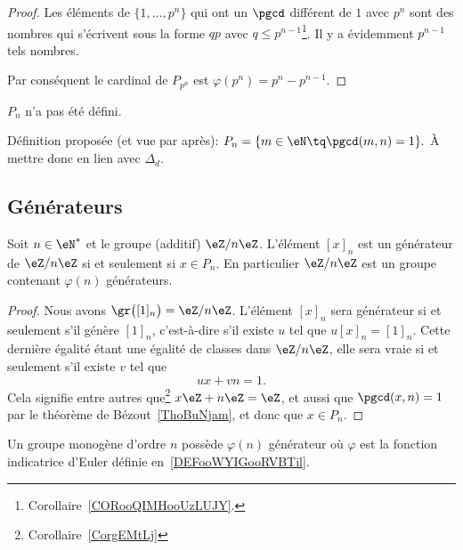 \begin{proof}
    Les éléments de \( \{ 1,\ldots,p^n \}\) qui ont un \( \pgcd\) différent de \( 1\) avec \( p^n\) sont des nombres qui s'écrivent sous la forme \( qp\) avec \( q\leq p^{n-1}\)\footnote{Corollaire~\ref{CORooQIMHooUzLUJY}.}. Il y a évidemment \( p^{n-1}\) tels nombres.

    Par conséquent le cardinal de \( P_{p^n}\) est \( \varphi(p^{n})=p^n-p^{n-1}\).
\end{proof}

\begin{probleme}
    $P_n$ n'a pas été défini.

    Définition proposée (et vue par après): \( P_n = \{ m \in \eN \tq \pgcd(m,n) = 1 \}. \) À mettre donc en lien avec $\Delta_d$.
\end{probleme}

\subsection{Générateurs}

\begin{proposition}     \label{PropZnmuphiGensn}
    Soit \( n\in\eN^*\) et le groupe (additif) \( \eZ/n\eZ\). L'élément \( [x]_n\) est un générateur de \( \eZ/n\eZ\) si et seulement si \( x\in P_n\). En particulier \( \eZ/n\eZ\) est un groupe contenant \( \varphi(n)\) générateurs.
\end{proposition}

\begin{proof}
    Nous avons \( \gr\big( [1]_n \big)=\eZ/n\eZ\). L'élément \( [x]_n\) sera générateur si et seulement s'il génère \( [1]_n \), c'est-à-dire s'il existe \( u\) tel que \( u[x]_n=[1]_n\). Cette dernière égalité étant une égalité de classes dans \( \eZ/n\eZ\), elle sera vraie si et seulement s'il existe \( v\) tel que
    \begin{equation}
        ux+vn=1.
    \end{equation}
    Cela signifie entre autres que\footnote{Corollaire~\ref{CorgEMtLj}} \( x\eZ+n\eZ=\eZ\), et aussi que \( \pgcd(x,n)=1\) par le théorème de Bézout~\ref{ThoBuNjam}, et donc que \( x\in P_n\).
\end{proof}

\begin{corollary}\label{CORooMBLSooMHKmAq}
    Un groupe monogène d'ordre \( n\) possède \( \varphi(n)\) générateur où \( \varphi\) est la fonction indicatrice d'Euler définie en~\ref{DEFooWYIGooRVBTil}.
\end{corollary}

